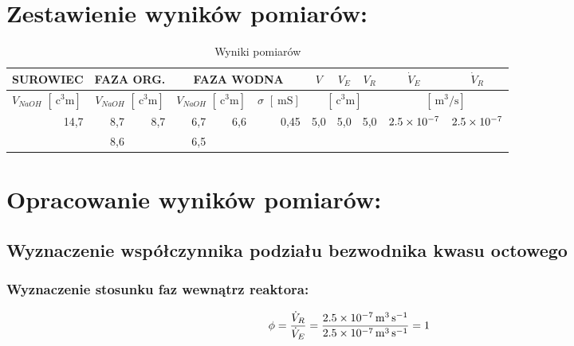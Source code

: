 \documentclass[11pt]{article}
\begin{document}
\section{Zestawienie wyników pomiarów:}
\begin{table}[htbp]
  \centering
  \caption{Wyniki pomiarów}
    \begin{tabular}{rrrrrrrrrrr}
    \toprule
    \multicolumn{1}{c}{SUROWIEC} & \multicolumn{2}{c}{FAZA ORG.} & \multicolumn{3}{c}{FAZA WODNA} & \multicolumn{1}{c}{$V$} & \multicolumn{1}{c}{$V_E$} & \multicolumn{1}{c}{$V_R$} & \multicolumn{1}{c}{$\dot{V}_E$} & \multicolumn{1}{c}{$\dot{V}_R$} \\
    \midrule
    \multicolumn{1}{l}{$V_{NaOH}$ $\displaystyle{\left[\SI{}{\cubic\centi\metre}\right]}$} & \multicolumn{2}{c}{$V_{NaOH}$ $\displaystyle{\left[\SI{}{\cubic\centi\metre}\right]}$} & \multicolumn{2}{c}{$V_{NaOH}$ $\displaystyle{\left[\SI{}{\cubic\centi\metre}\right]}$} & \multicolumn{1}{l}{$\sigma$ $\displaystyle{\left[\SI{}{\milli\siemens}\right]}$} & \multicolumn{3}{c}{$\displaystyle{\left[\SI{}{\cubic\centi\metre}\right]}$} & \multicolumn{2}{c}{$\displaystyle{\left[\SI{}{\cubic\metre\per\second}\right]}$} \\
    \midrule
    \multirow{2}[4]{*}{14,7} & 8,7   & \multirow{2}[4]{*}{8,7} & 6,7   & \multirow{2}[4]{*}{6,6} & \multirow{2}[4]{*}{0,45} & \multirow{2}[4]{*}{5,0} & \multirow{2}[4]{*}{5,0} & \multirow{2}[4]{*}{5,0} & \multirow{2}[4]{*}{$\num{2,5E-07}$} & \multirow{2}[4]{*}{$\num{2,5E-07}$} \\
\cmidrule{2-2}\cmidrule{4-4}          & 8,6   &       & 6,5   &       &       &       &       &       &       &  \\
    \bottomrule
    \end{tabular}%
  \label{tab:addlabel}%
\end{table}%
\section{Opracowanie wyników pomiarów:}
\subsection{Wyznaczenie współczynnika podziału bezwodnika kwasu octowego}
\subsubsection{Wyznaczenie stosunku faz wewnątrz reaktora:}
\begin{equation}
\phi=\frac{\dot{V}_R}{\dot{V}_E}=\frac{\SI{2,5E-07}{\cubic\metre\per\second}}{\SI{2,5E-07}{\cubic\metre\per\second}}=1
\end{equation}
\end{document}
